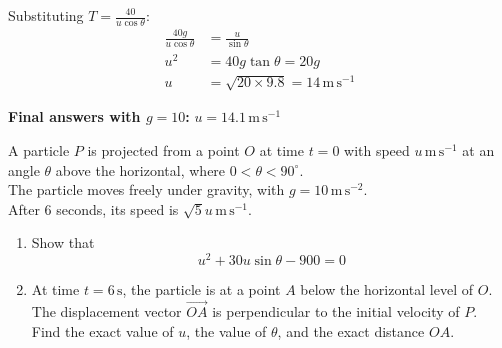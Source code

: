 \documentclass[leqno]{article}
\begin{document}
\begin{enumerate}[
  label=\textbf{\arabic*.},
  leftmargin=*,
  topsep=0pt,
  partopsep=0pt,
  parsep=0pt
]
\begin{djsSolution}
Substituting \(T=\frac{40}{u\cos\theta}\):
\begin{align*}
\frac{40g}{u\cos\theta}&=\frac{u}{\sin\theta}\\
u^2&=40g\tan\theta=20g\\
u&=\sqrt{20\times9.8}=14\,\mathrm{m\,s^{-1}}
\end{align*}

\par\medskip\noindent\textbf{Final answers with \(g = 10\):} \(u=14.1\,\mathrm{m\,s^{-1}}\)
\end{djsSolution}

\newpage

\questionitem

A particle $P$ is projected from a point $O$ at time $t=0$ with speed $u\,\mathrm{m\,s^{-1}}$ at an angle $\theta$ above the horizontal, where $0<\theta<90^\circ$. \\
The particle moves freely under gravity, with $g=10\,\mathrm{m\,s^{-2}}$. \\
After $6$ seconds, its speed is $\sqrt{5}u\,\mathrm{m\,s^{-1}}$. \\

\begin{enumerate}[label=\textbf{(\alph*)}]
\item Show that
\[
u^2+30u\sin\theta-900=0
\] 
\item At time $t=6\,\mathrm{s}$, the particle is at a point $A$ below the horizontal level of $O$. \\
The displacement vector $\overrightarrow{OA}$ is perpendicular to the initial velocity of $P$. \\
Find the exact value of $u$, the value of $\theta$, and the exact distance $OA$.  \\
\end{enumerate}

\vspace*{10pt}

\begin{djsSolution}
\begin{djsSolutionFigure}
\end{djsSolutionFigure}
\end{djsSolution}
\end{enumerate}
\end{document}
